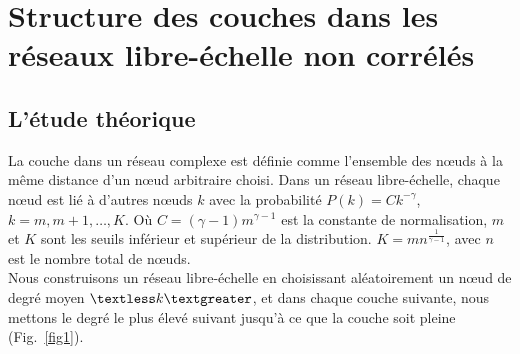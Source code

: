 \section{Structure des couches dans les réseaux libre-échelle non corrélés}
        \subsection{L'étude théorique}
La couche dans un réseau complexe est définie comme l'ensemble des nœuds à la même distance d'un nœud arbitraire choisi. Dans un réseau libre-échelle, chaque nœud est lié à d'autres nœuds $k$ avec la probabilité $P(k)=Ck^{-\gamma}$, $k=m, m + 1, \ldots, K$. Où $C=(\gamma-1)m^{\gamma-1}$ est la constante de normalisation, $m$ et $K$ sont les seuils inférieur et supérieur de la distribution. $K=mn^{\frac{1}{\gamma-1}}$, avec $n$ est le nombre total de nœuds. \\
Nous construisons un réseau libre-échelle en choisissant aléatoirement un nœud de degré moyen $\km$, et dans chaque couche suivante, nous mettons le degré le plus élevé suivant jusqu'à ce que la couche soit pleine (Fig.~\ref{fig1}).\\
